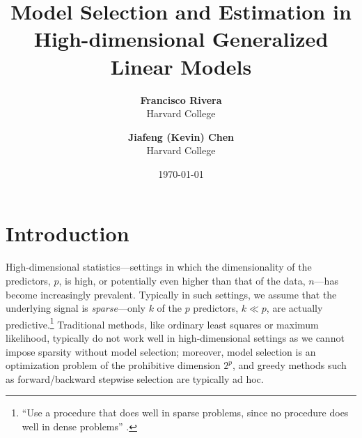 \documentclass[letterpaper, 12pt]{article}
\begin{document}
\title{\textbf{Model Selection and Estimation in High-dimensional
Generalized Linear Models}}
\author{\textbf{Francisco Rivera} \\ Harvard College \and \textbf{Jiafeng (Kevin) Chen} \\ Harvard College}
\date{\today}

\maketitle
\doublespacing
\section{Introduction}
\label{sec:intro}
High-dimensional statistics---settings in which the dimensionality of the
predictors, $p$, is high, or potentially even higher than that of the data,
$n$---has become increasingly prevalent. Typically in such settings, we assume
that the underlying signal is \emph{sparse}---only $k$ of the $p$ predictors, $k
\ll p$, are actually predictive.\footnote{``Use a procedure that does well in
sparse problems, since no procedure does well in dense problems''
\citep{hastie2015statistical}.} Traditional methods, like ordinary least squares
or maximum likelihood, typically do not work well in high-dimensional settings
as we cannot impose sparsity without model selection; moreover, model selection
is an optimization problem of the prohibitive dimension $2^p$, and greedy
methods such as forward/backward stepwise selection are typically ad hoc.
\end{document}
